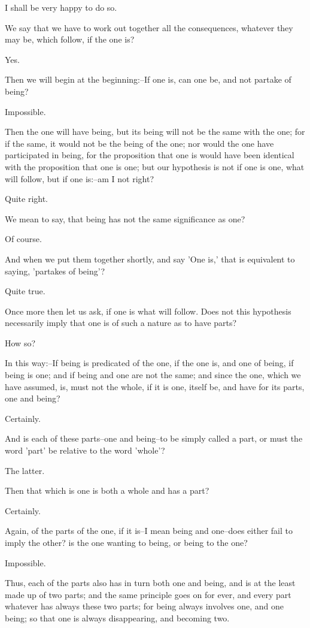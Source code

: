 I shall be very happy to do so.

We say that we have to work out together all the consequences, whatever
they may be, which follow, if the one is?

Yes.

Then we will begin at the beginning:--If one is, can one be, and not
partake of being?

Impossible.

Then the one will have being, but its being will not be the same with
the one; for if the same, it would not be the being of the one; nor
would the one have participated in being, for the proposition that one
is would have been identical with the proposition that one is one;
but our hypothesis is not if one is one, what will follow, but if one
is:--am I not right?

Quite right.

We mean to say, that being has not the same significance as one?

Of course.

And when we put them together shortly, and say 'One is,' that is
equivalent to saying, 'partakes of being'?

Quite true.

Once more then let us ask, if one is what will follow. Does not this
hypothesis necessarily imply that one is of such a nature as to have
parts?

How so?

In this way:--If being is predicated of the one, if the one is, and one
of being, if being is one; and if being and one are not the same; and
since the one, which we have assumed, is, must not the whole, if it is
one, itself be, and have for its parts, one and being?

Certainly.

And is each of these parts--one and being--to be simply called a part,
or must the word 'part' be relative to the word 'whole'?

The latter.

Then that which is one is both a whole and has a part?

Certainly.

Again, of the parts of the one, if it is--I mean being and one--does
either fail to imply the other? is the one wanting to being, or being to
the one?

Impossible.

Thus, each of the parts also has in turn both one and being, and is at
the least made up of two parts; and the same principle goes on for ever,
and every part whatever has always these two parts; for being always
involves one, and one being; so that one is always disappearing, and
becoming two.

